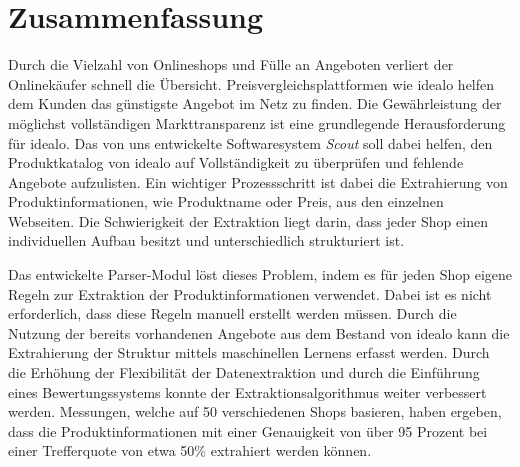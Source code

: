 \section*{Zusammenfassung}
\label{sec:abstract}

Durch die Vielzahl von Onlineshops und Fülle an Angeboten verliert der Onlinekäufer schnell die Übersicht.
Preisvergleichsplattformen wie idealo helfen dem Kunden das günstigste Angebot im Netz zu finden.
Die Gewährleistung der möglichst vollständigen Markttransparenz ist eine grundlegende Herausforderung für idealo.
Das von uns entwickelte Softwaresystem \textit{Scout} soll dabei helfen, den Produktkatalog von idealo auf
Vollständigkeit zu überprüfen und fehlende Angebote aufzulisten.
Ein wichtiger Prozessschritt ist dabei die Extrahierung von Produktinformationen, wie Produktname oder Preis, aus den
einzelnen Webseiten.
Die Schwierigkeit der Extraktion liegt darin, dass jeder Shop einen individuellen Aufbau besitzt und unterschiedlich
strukturiert ist.

Das entwickelte Parser-Modul löst dieses Problem, indem es für jeden Shop eigene Regeln zur Extraktion der
Produktinformationen verwendet.
Dabei ist es nicht erforderlich, dass diese Regeln manuell erstellt werden müssen.
Durch die Nutzung der bereits vorhandenen Angebote aus dem Bestand von idealo kann die Extrahierung der Struktur
mittels maschinellen Lernens erfasst werden.
Durch die Erhöhung der Flexibilität der Datenextraktion und durch die Einführung eines Bewertungssystems konnte der
Extraktionsalgorithmus weiter verbessert werden.
Messungen, welche auf 50 verschiedenen Shops basieren, haben ergeben, dass die Produktinformationen mit einer
Genauigkeit von über 95 Prozent bei einer Trefferquote von etwa 50\% extrahiert werden können.